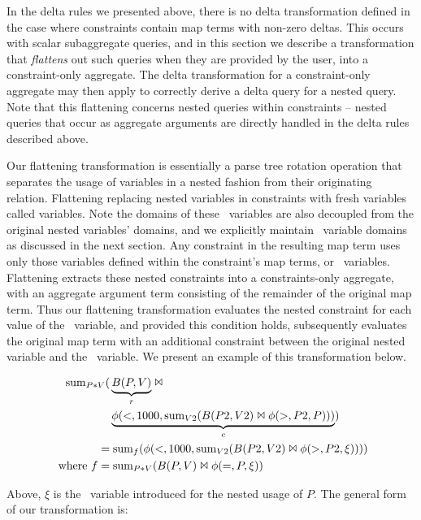 In the delta rules we presented above, there is no delta transformation defined
in the case where constraints contain map terms with non-zero deltas. This
occurs with scalar subaggregate queries, and in this section we describe a
transformation that \textit{flattens} out such queries when they are provided by
the user, into a constraint-only aggregate. The delta transformation for a
constraint-only aggregate may then apply to correctly derive a delta query for
a nested query. Note that this flattening concerns nested queries within
constraints -- nested queries that occur as aggregate arguments are directly
handled in the delta rules described above.

Our flattening transformation is essentially a parse tree rotation operation
that separates the usage of variables in a nested fashion from their originating
relation. Flattening replacing nested variables in constraints with fresh
variables called \textit{\bigsum} variables.
Note the domains of these \bigsum\ variables are also decoupled from the
original nested variables' domains, and we explicitly maintain \bigsum\ variable
domains as discussed in the next section.  Any constraint in the resulting map
term uses only those variables defined within the constraint's map terms, or
\bigsum\ variables. Flattening extracts these nested constraints into a
constraints-only aggregate, with an aggregate argument term consisting of the
remainder of the original map term. Thus our flattening transformation evaluates
the nested constraint for each value of the \bigsum\ variable, and provided this
condition holds, subsequently evaluates the original map term with an additional
constraint between the original nested variable and the \bigsum\ variable. We
present an example of this transformation below.

\begin{align*}
\mathrm{sum}_{P*V}( & \underbrace{B(P,V)}_{r} \Join \\
& \underbrace{\phi(<, 1000, \mathrm{sum}_{V2}(B(P2,V2) \Join \phi(>, P2, P)))}_{c}) \\
= & \; \mathrm{sum}_{f}(\phi(<, 1000, \mathrm{sum}_{V2}(B(P2,V2) \Join \phi(>, P2, \xi)))) \\
\mbox{ where } f = & \; \mathrm{sum}_{P*V}(B(P,V) \Join \phi(=,P,\xi))
\end{align*}

Above, $\xi$ is the \bigsum\ variable introduced for the nested usage of $P$.
The general form of our transformation is:

